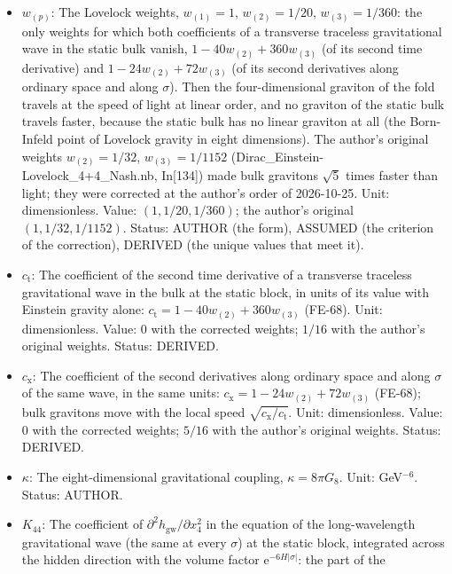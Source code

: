 \documentclass[
  10pt,
]{article}
\providecommand{\tightlist}{%
  \setlength{\itemsep}{0pt}\setlength{\parskip}{0pt}}
\begin{document}
\begin{itemize}
\tightlist
\item
  \(w_{(p)}\): The Lovelock weights, \(w_{(1)} = 1\),
  \(w_{(2)} = 1/20\), \(w_{(3)} = 1/360\): the only weights for which
  both coefficients of a transverse traceless gravitational wave in the
  static bulk vanish, \(1 - 40w_{(2)} + 360w_{(3)}\) (of its second time
  derivative) and \(1 - 24w_{(2)} + 72w_{(3)}\) (of its second
  derivatives along ordinary space and along \(\sigma\)). Then the
  four-dimensional graviton of the fold travels at the speed of light at
  linear order, and no graviton of the static bulk travels faster,
  because the static bulk has no linear graviton at all (the Born-Infeld
  point of Lovelock gravity in eight dimensions). The author's original
  weights \(w_{(2)} = 1/32\), \(w_{(3)} = 1/1152\)
  (Dirac\_Einstein-Lovelock\_4+4\_Nash.nb, In{[}134{]}) made bulk
  gravitons \(\sqrt5\) times faster than light; they were corrected at
  the author's order of 2026-10-25. Unit: dimensionless. Value:
  \((1, 1/20, 1/360)\); the author's original \((1, 1/32, 1/1152)\).
  Status: AUTHOR (the form), ASSUMED (the criterion of the correction),
  DERIVED (the unique values that meet it).
\item
  \(c_{\mathrm{t}}\): The coefficient of the second time derivative of a
  transverse traceless gravitational wave in the bulk at the static
  block, in units of its value with Einstein gravity alone:
  \(c_{\mathrm{t}} = 1 - 40w_{(2)} + 360w_{(3)}\) (FE-68). Unit:
  dimensionless. Value: 0 with the corrected weights; \(1/16\) with the
  author's original weights. Status: DERIVED.
\item
  \(c_{\mathrm{x}}\): The coefficient of the second derivatives along
  ordinary space and along \(\sigma\) of the same wave, in the same
  units: \(c_{\mathrm{x}} = 1 - 24w_{(2)} + 72w_{(3)}\) (FE-68); bulk
  gravitons move with the local speed
  \(\sqrt{c_{\mathrm{x}}/c_{\mathrm{t}}}\). Unit: dimensionless. Value:
  0 with the corrected weights; \(5/16\) with the author's original
  weights. Status: DERIVED.
\item
  \(\kappa\): The eight-dimensional gravitational coupling,
  \(\kappa = 8\pi G_8\). Unit: GeV\(^{-6}\). Status: AUTHOR.
\item
  \(K_{44}\): The coefficient of
  \(\partial^2h_{\mathrm{gw}}/\partial x_4^2\) in the equation of the
  long-wavelength gravitational wave (the same at every \(\sigma\)) at
  the static block, integrated across the hidden direction with the
  volume factor \(\mathrm{e}^{-6H\lvert\sigma\rvert}\): the part of the

\end{itemize}
\end{document}
